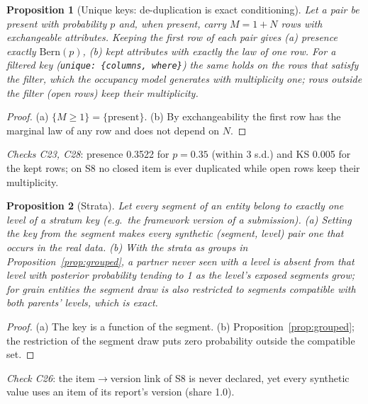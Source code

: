 \documentclass[11pt,a4paper]{article}
\newtheorem{proposition}{Proposition}
\theoremstyle{definition}
\theoremstyle{remark}
\begin{document}
\begin{proposition}[Unique keys: de-duplication is exact conditioning]\label{prop:unique}
Let a pair be present with probability $p$ and, when present, carry $M=1+N$ rows with exchangeable attributes. Keeping the first row of each pair gives (a) presence exactly $\mathrm{Bern}(p)$, (b) kept attributes with exactly the law of one row. For a filtered key (\texttt{unique: \{columns, where\}}) the same holds on the rows that satisfy the filter, which the occupancy model generates with multiplicity one; rows outside the filter (open rows) keep their multiplicity.
\end{proposition}
\begin{proof}
(a) $\{M\ge1\}=\{\text{present}\}$. (b) By exchangeability the first row has the marginal law of any row and does not depend on $N$.
\end{proof}
\noindent\emph{Checks C23, C28}: presence 0.3522 for $p=0.35$ (within 3 s.d.) and KS 0.005 for the kept rows; on S8 no closed item is ever duplicated while open rows keep their multiplicity.

\begin{proposition}[Strata]\label{prop:strata}
Let every segment of an entity belong to exactly one level of a stratum key (e.g.\ the framework version of a submission). (a) Setting the key from the segment makes every synthetic (segment, level) pair one that occurs in the real data. (b) With the strata as groups in Proposition~\ref{prop:grouped}, a partner never seen with a level is absent from that level with posterior probability tending to 1 as the level's exposed segments grow; for grain entities the segment draw is also restricted to segments compatible with both parents' levels, which is exact.
\end{proposition}
\begin{proof}
(a) The key is a function of the segment. (b) Proposition~\ref{prop:grouped}; the restriction of the segment draw puts zero probability outside the compatible set.
\end{proof}
\noindent\emph{Check C26}: the item$\to$version link of S8 is never declared, yet every synthetic value uses an item of its report's version (share 1.0).
\end{document}
